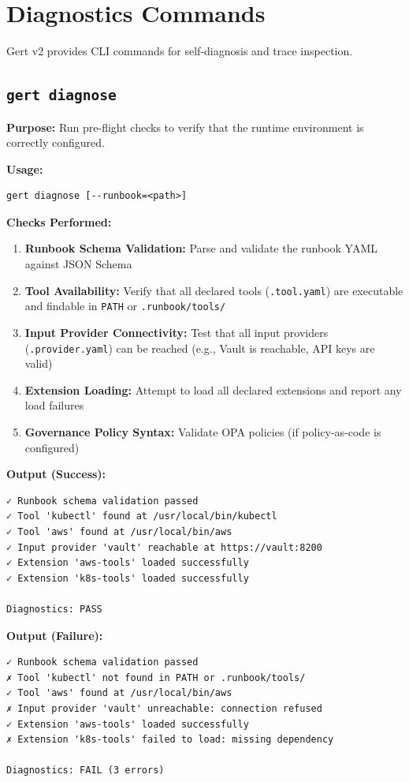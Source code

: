 \section{Diagnostics Commands}

Gert v2 provides CLI commands for self-diagnosis and trace inspection.

\subsection{\texttt{gert diagnose}}

\textbf{Purpose:} Run pre-flight checks to verify that the runtime environment is correctly configured.

\textbf{Usage:}
\begin{verbatim}
gert diagnose [--runbook=<path>]
\end{verbatim}

\textbf{Checks Performed:}
\begin{enumerate}
  \item \textbf{Runbook Schema Validation:} Parse and validate the runbook YAML against JSON Schema
  \item \textbf{Tool Availability:} Verify that all declared tools (\texttt{.tool.yaml}) are executable and findable in \texttt{PATH} or \texttt{.runbook/tools/}
  \item \textbf{Input Provider Connectivity:} Test that all input providers (\texttt{.provider.yaml}) can be reached (e.g., Vault is reachable, API keys are valid)
  \item \textbf{Extension Loading:} Attempt to load all declared extensions and report any load failures
  \item \textbf{Governance Policy Syntax:} Validate OPA policies (if policy-as-code is configured)
\end{enumerate}

\textbf{Output (Success):}
\begin{verbatim}
✓ Runbook schema validation passed
✓ Tool 'kubectl' found at /usr/local/bin/kubectl
✓ Tool 'aws' found at /usr/local/bin/aws
✓ Input provider 'vault' reachable at https://vault:8200
✓ Extension 'aws-tools' loaded successfully
✓ Extension 'k8s-tools' loaded successfully

Diagnostics: PASS
\end{verbatim}

\textbf{Output (Failure):}
\begin{verbatim}
✓ Runbook schema validation passed
✗ Tool 'kubectl' not found in PATH or .runbook/tools/
✓ Tool 'aws' found at /usr/local/bin/aws
✗ Input provider 'vault' unreachable: connection refused
✓ Extension 'aws-tools' loaded successfully
✗ Extension 'k8s-tools' failed to load: missing dependency

Diagnostics: FAIL (3 errors)
\end{verbatim}

